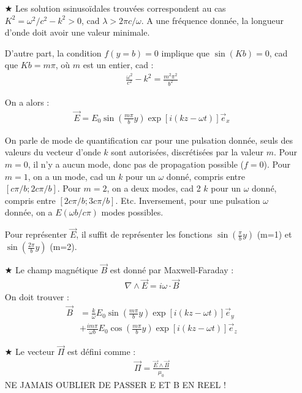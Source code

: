 \documentclass{report}
\begin{document}
\begin{itemize}
	\item[$\bigstar$]	Les solution ssinusoïdales trouvées correspondent au cas $K^2=\omega^2/c^2-k^2>0$, cad $\lambda>2\pi c/\omega$. A une fréquence donnée, la longueur d'onde doit avoir une valeur minimale.
	
	 D'autre part, la condition $f(y=b)=0$ implique que $\sin(Kb)=0$, cad que $Kb=m\pi$, où $m$ est un entier, cad :
	 \begin{align*}
	 	\frac{\omega^2}{c^2}-k^2=\frac{m^2\pi^2}{b^2}
	 \end{align*}
	 
	On a alors :	 
	\begin{align*}
		\vec{E}=E_0\sin\left(\frac{m\pi}{b}y\right) \exp[i(kz-\omega t)]\vec{e}_x
	\end{align*}
		 
	 On parle de mode de quantification car pour une pulsation donnée, seuls des valeurs du vecteur d'onde $k$ sont autorisées, discrétisées par la valeur $m$. Pour $m=0$, il n'y a  aucun mode, donc pas de propagation possible ($f=0$). Pour $m=1$, on a un mode, cad un $k$ pour un $\omega$ donné, compris entre $[c\pi/b;2c\pi/b]$. Pour $m=2$, on a deux modes, cad 2 $k$ pour un $\omega$ donné, compris entre $[2c\pi/b;3c\pi/b]$. Etc. Inversement, pour une pulsation $\omega$ donnée, on a $E(\omega b/c\pi)$ modes possibles.
	 
	 Pour représenter $\vec{E}$, il suffit de représenter les fonctions $\sin(\frac{\pi}{b}y)$ (m=1) et $\sin(\frac{2\pi}{b}y)$ (m=2).
	
	\item[$\bigstar$] Le champ magnétique $\vec{B}$ est donné par Maxwell-Faraday :
	\begin{align*}
		\nabla\wedge \vec{E}=i\omega\cdot\vec{B}
	\end{align*}
	On doit trouver :
	\begin{align*}
		\vec{B}&=\frac{k}{\omega}E_0\sin\left(\frac{m\pi}{b}y\right) \exp[i(kz-\omega t)]\vec{e}_y \\
		&+\frac{im\pi}{\omega b}E_0\cos\left(\frac{m\pi}{b}y\right) \exp[i(kz-\omega t)]\vec{e}_z
	\end{align*}
	
	\item[$\bigstar$] Le vecteur $\vec{\Pi}$ est défini comme :
	\begin{align*}
		\vec{\Pi}=\frac{\vec{E}\wedge\vec{B}}{\mu_0}
	\end{align*}
	NE JAMAIS OUBLIER DE PASSER E ET B EN REEL ! 
	

\end{itemize}
\end{document}
